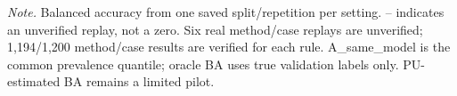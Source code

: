 \noindent\textit{Note.} Balanced accuracy from one saved split/repetition per setting. -- indicates an unverified replay, not a zero. Six real method/case replays are unverified; 1,194/1,200 method/case results are verified for each rule. A\_same\_model is the common prevalence quantile; oracle BA uses true validation labels only. PU-estimated BA remains a limited pilot.
\par\endgroup
